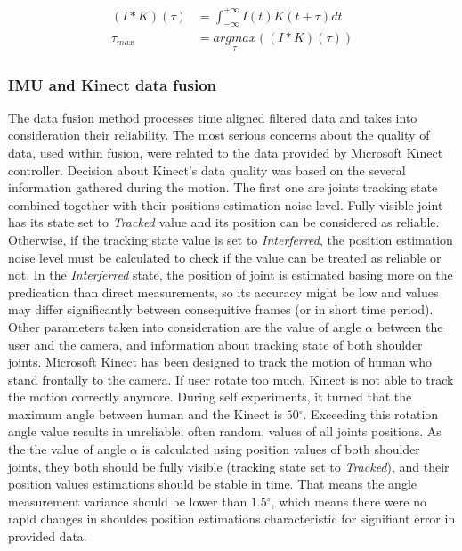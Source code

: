 \documentclass[sensors,article,submit,moreauthors,pdftex,10pt,a4paper]{mdpi}
\newcommand{\degree}{\ensuremath{{}^{\circ}}\xspace}
\begin{document}
	\begin{subequations}
		\begin{align}
			(I \ast K)(\tau) & = \int_{-\infty}^{+\infty}I(t)K(t+\tau)dt\label{eq:cross-cor:1}   \\
			\tau_{max}       & = \underset{\tau}{argmax}((I \ast K)(\tau))\label{eq:cross-cor:2} 
		\end{align}
		\label{eq:cross-cor}
	\end{subequations}
	
	
	
	\subsubsection{IMU and Kinect data fusion}
	The data fusion method processes time aligned filtered data and takes into consideration their reliability. The most serious concerns about the quality of data, used within fusion, were related to the data provided by Microsoft Kinect controller. Decision about Kinect’s data quality was based on the several information gathered during the motion. The first one are joints tracking state combined together with their positions estimation noise level. Fully visible joint has its state set to \emph{Tracked} value and its position can be considered as reliable. Otherwise, if the tracking state value is set to \emph{Interferred}, the position estimation noise level must be calculated to check if the value can be treated as reliable or not. In the \emph{Interferred} state, the position of joint is estimated basing more on the predication than direct measurements, so its accuracy might be low and values may differ significantly between consequitive frames (or in short time period). Other parameters taken into consideration are the value of angle $\alpha$ between the user and the camera, and information about tracking state of both shoulder joints. Microsoft Kinect has been designed to track the motion of human who stand frontally to the camera. If user rotate too much, Kinect is not able to track the motion correctly anymore. During self experiments, it turned that the maximum angle between human and the Kinect is $50\degree$. Exceeding this rotation angle value results in unreliable, often random, values of all joints positions. As the the value of angle $\alpha$ is calculated using position values of both shoulder joints, they both should be fully visible (tracking state set to \emph{Tracked}), and their position values estimations should be stable in time. That means the angle measurement variance should be lower than $1.5\degree$, which means there were no rapid changes in shouldes position estimations characteristic for signifiant error in provided data. 
	
\end{document}

